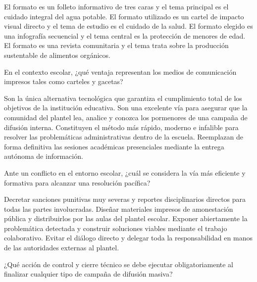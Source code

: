 \documentclass[12pt]{evaluasep}
\begin{document}
\begin{questions}
    \begin{choices}
        \choice El formato es un folleto informativo de tres caras y el tema principal es el cuidado integral del agua potable.
        \CorrectChoice El formato utilizado es un cartel de impacto visual directo y el tema de estudio es el cuidado de la salud.
        \choice El formato elegido es una infografía secuencial y el tema central es la protección de menores de edad.
        \choice El formato es una revista comunitaria y el tema trata sobre la producción sustentable de alimentos orgánicos.
    
    \end{choices}
    

    \question En el contexto escolar, ¿qué ventaja representan los medios de comunicación impresos tales como carteles y gacetas?
    
    \begin{choices}
        \choice Son la única alternativa tecnológica que garantiza el cumplimiento total de los objetivos de la institución educativa.
        \CorrectChoice Son una excelente vía para asegurar que la comunidad del plantel lea, analice y conozca los pormenores de una campaña de difusión interna.
        \choice Constituyen el método más rápido, moderno e infalible para resolver las problemáticas administrativas dentro de la escuela.
        \choice Reemplazan de forma definitiva las sesiones académicas presenciales mediante la entrega autónoma de información.
    
    \end{choices}
    
\newpage
    \question Ante un conflicto en el entorno escolar, ¿cuál se considera la vía más eficiente y formativa para alcanzar una resolución pacífica?
    
    \begin{choices}
        \choice Decretar sanciones punitivas muy severas y reportes disciplinarios directos para todas las partes involucradas.
        \choice Diseñar materiales impresos de amonestación pública y distribuirlos por las aulas del plantel escolar.
        \CorrectChoice Exponer abiertamente la problemática detectada y construir soluciones viables mediante el trabajo colaborativo.
        \choice Evitar el diálogo directo y delegar toda la responsabilidad en manos de las autoridades externas al plantel.
    
    \end{choices}
    

    \question ¿Qué acción de control y cierre técnico se debe ejecutar obligatoriamente al finalizar cualquier tipo de campaña de difusión masiva?
    

\end{questions}
\end{document}
